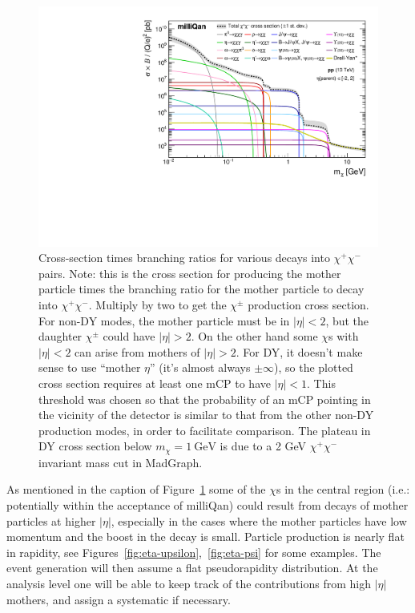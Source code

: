 \documentclass[12pt]{article}
\begin{document}
\begin{figure}
  \begin{center}
  \includegraphics[width=0.8\linewidth]{../scripts/plot-xsecs/mcp-xsec.pdf}
  \caption{\protect Cross-section times branching ratios for various
    decays into $\chi^+ \chi^-$ pairs.  Note: this is
    the cross section for producing the mother particle times the
    branching ratio for the mother particle to decay into $\chi^+ \chi^-$.
    Multiply by two to get the $\chi^{\pm}$ production cross section.
    For non-DY modes, the mother particle must be in $|\eta|<2$, but the
    daughter $\chi^{\pm}$ could have $|\eta|>2$.  On the other hand some
    $\chi$s with $|\eta|<2$ can arise from mothers of $|\eta|>2$. For DY,
    it doesn't make sense to use ``mother $\eta$'' (it's almost always $\pm\infty$), 
    so the plotted cross section requires at least one mCP to have $|\eta|<1$. 
    This threshold was chosen so that the probability of an mCP pointing in the vicinity of 
    the detector is similar to that from the other non-DY production modes, 
    in order to facilitate comparison. The plateau in DY cross section below 
    $m_\chi=1~\text{GeV}$ is due to a 2 GeV $\chi^+\chi^-$ invariant mass cut in MadGraph.}
\label{fig:total-rates}
\end{center}
  \end{figure}



As mentioned in the caption of Figure~\ref{fig:total-rates} some
of the $\chi$s in the central region (i.e.: potentially within
the acceptance of milliQan) could result from decays of mother
particles at higher $|\eta|$, especially in the cases where
the mother particles have low momentum and the boost in the
decay is small.
Particle production is
nearly flat in rapidity, see
Figures~\ref{fig:eta-upsilon},~\ref{fig:eta-psi}
for some examples.
The event generation will then
assume a flat pseudorapidity distribution.
At the analysis level one will be able to keep track of the
contributions from high $|\eta|$ mothers, and assign a systematic
if necessary.
\end{document}
